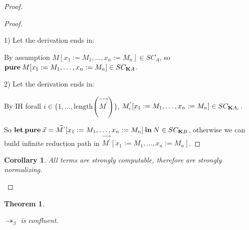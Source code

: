 \documentclass[a4paper]{article}
\newtheorem{theorem}{Theorem}
\newtheorem{col}{Corollary}
\begin{document}
\begin{proof}
\begin{proof}
  $ $

  1) Let the derivation ends in:

\begin{prooftree}
\end{prooftree}

  By assumption $M [x_1 := M_1,\dots,x_n := M_n] \in SC_A$, so ${\bf pure \:} M [x_1 := M_1,\dots,x_n := M_n] \in SC_{{\bf K}A}$.

\vspace{\baselineskip}

  2) Let the derivation ends in:
\begin{prooftree}
\end{prooftree}

By IH forall $i \in \{ 1,\dots,\text{length}(\vec{M^{'}}) \}$, $M_i^{'} [x_1 := M_1,\dots,x_n := M_n] \in SC_{{\bf K}A_i}$.

So ${\bf let \: pure \:} \vec{x} = \vec{M^{'}} [x_1 := M_1,\dots,x_n := M_n] {\: \bf in \:} N \in SC_{{\bf K} B}$,
otherwise we can build infinite reduction path in $\vec{M^{'}} [x_1 := M_1,\dots,x_n := M_n]$.
\end{proof}

\begin{col}

  All terms are strongly computable, therefore are strongly normalizing.
\end{col}

\end{proof}

\begin{theorem}
  $ $

  $\twoheadrightarrow_{\beta}$ is confluent.
\end{theorem}
\end{document}
